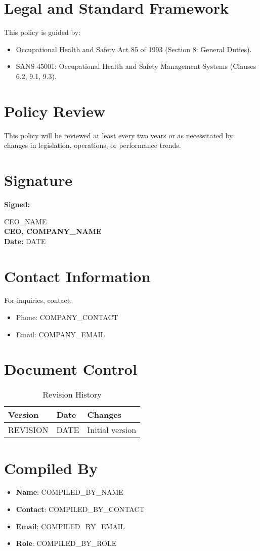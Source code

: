 \documentclass[12pt]{article}
\begin{document}
\section{Legal and Standard Framework}
This policy is guided by:
\begin{itemize}
    \item Occupational Health and Safety Act 85 of 1993 (Section 8: General Duties).
    \item SANS 45001: Occupational Health and Safety Management Systems (Clauses 6.2, 9.1, 9.3).
\end{itemize}

\section{Policy Review}
This policy will be reviewed at least every two years or as necessitated by changes in legislation, operations, or performance trends.

\section{Signature}
\textbf{Signed:}

{{CEO_NAME}}\\
\textbf{CEO, {{COMPANY_NAME}}}\\
\textbf{Date:} {{DATE}}

\section{Contact Information}
For inquiries, contact:
\begin{itemize}
    \item Phone: {{COMPANY_CONTACT}}
    \item Email: {{COMPANY_EMAIL}}
\end{itemize}

\section{Document Control}
\begin{table}[h]
    \centering
    \begin{tabular}{p{3cm}p{3cm}p{6cm}}
        \toprule
        \textbf{Version} & \textbf{Date} & \textbf{Changes} \\
        \midrule
        {{REVISION}} & {{DATE}} & Initial version \\
        \bottomrule
    \end{tabular}
    \caption{Revision History}
\end{table}

\section{Compiled By}
\begin{itemize}
    \item \textbf{Name}: {{COMPILED_BY_NAME}}
    \item \textbf{Contact}: {{COMPILED_BY_CONTACT}}
    \item \textbf{Email}: {{COMPILED_BY_EMAIL}}
    \item \textbf{Role}: {{COMPILED_BY_ROLE}}
\end{itemize}
\end{document}
